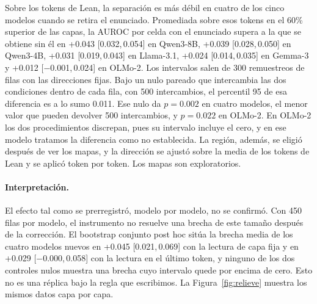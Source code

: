 \documentclass[10pt]{article}
\newcommand{\ic}[2]{[#1,\,#2]}
\begin{document}
Sobre los tokens de Lean, la separación es más débil en cuatro de los cinco modelos cuando se retira el enunciado.
Promediada sobre esos tokens en el 60\% superior de las capas, la AUROC por celda con el enunciado supera a la que
se obtiene sin él en +0.043 \ic{0.032}{0.054} en Qwen3-8B, +0.039 \ic{0.028}{0.050} en Qwen3-4B, +0.031
\ic{0.019}{0.043} en Llama-3.1, +0.024 \ic{0.014}{0.035} en Gemma-3 y +0.012 \ic{−0.001}{0.024} en OLMo-2. Los
intervalos salen de 300 remuestreos de filas con las direcciones fijas. Bajo un nulo pareado que intercambia las
dos condiciones dentro de cada fila, con 500 intercambios, el percentil 95 de esa diferencia es a lo sumo 0.011.
Ese nulo da $p = 0.002$ en cuatro modelos, el menor valor que pueden devolver 500 intercambios, y $p = 0.022$ en
OLMo-2. En OLMo-2 los dos procedimientos discrepan, pues su intervalo incluye el cero, y en ese modelo tratamos la
diferencia como no establecida. La región, además, se eligió después de ver los mapas, y la dirección se ajustó
sobre la media de los tokens de Lean y se aplicó token por token. Los mapas son exploratorios.

\paragraph{Interpretación.}
El efecto tal como se prerregistró, modelo por modelo, no se confirmó. Con 450 filas por modelo, el instrumento no
resuelve una brecha de este tamaño después de la corrección. El bootstrap conjunto post hoc sitúa la brecha media
de los cuatro modelos nuevos en +0.045 \ic{0.021}{0.069} con la lectura de capa fija y en +0.029
\ic{−0.000}{0.058} con la lectura en el último token, y ninguno de los dos controles nulos muestra una brecha cuyo intervalo quede por encima de cero. Esto no es una réplica bajo la regla que escribimos.
La Figura~\ref{fig:relieve} muestra los mismos datos capa por capa.
\end{document}

